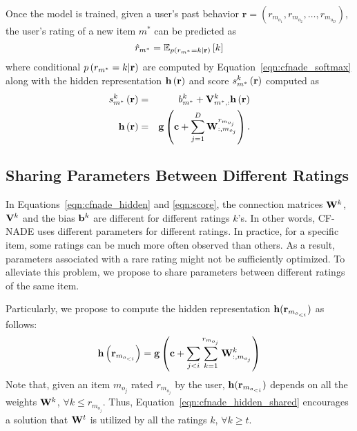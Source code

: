 \documentclass{article}
\newcommand{\cfnade}{CF-NADE\xspace}
\begin{document}
Once the model is trained, given a user's past behavior $\mathbf{r} =
(r_{m_{o_1}}, r_{m_{o_2}}, \ldots, r_{m_{o_D}})$, the user's rating of
a new item $m^*$ can be predicted as 
\begin{equation}
{\hat r}_{m^*} = \mathbb{E}_{p\left ( r_{m^{*}}=k|{\bf r} \right )}\left[k\right]
\end{equation}
where conditional $p\left ( r_{m^{*}}=k|{\bf r} \right )$ are computed by Equation~\ref{eqn:cfnade_softmax} along with the hidden representation $\mathbf{h}\left ( {\bf r} \right )$ and score $s_{m^*}^{k}\left({\bf r}\right)$ computed as 
\begin{eqnarray}
s_{m^*}^{k}\left({\bf r}\right) &=&b^{k}_{m^*} +\mathbf{V}^{k}_{m^*,:}\mathbf{h}\left ( {\bf r} \right )\\
\mathbf{h}\left ( {\bf r} \right ) &=& {\bf g}\left( \mathbf{c}+\sum_{j=1}^D\mathbf{W}^{r_{m_{o_j}}}_{:,m_{o_j}} \right ) .
\end{eqnarray}






\subsection{Sharing Parameters Between Different Ratings}
\label{sec:accu}

In Equations~\ref{eqn:cfnade_hidden} and \ref{eqn:score}, the
connection matrices ${\bf W}^k$, ${\bf V}^k$ and the bias ${\bf b}^k$
are different for different ratings $k$'s. In other words, \cfnade
uses different parameters for different ratings. In practice, for a
specific item, some ratings can be much more often observed than
others.  As a result, parameters associated with a rare rating might
not be sufficiently optimized. To alleviate this problem, we propose
to share parameters between different ratings of the same item.

Particularly, we propose to compute the hidden representation $\mathbf{h} ( {\bf r}_{m_{o_{<i}}} )$ as follows:
\begin{equation}
  \mathbf{h}\left ( {\bf r}_{m_{o_{<i}}} \right ) = {\bf g}\left( \mathbf{c}+\sum_{j<i}\sum_{k=1}^{r_{m_{o_j}}}\mathbf{W}_{:,m_{o_j}}^{k} \right ) \label{eqn:cfnade_hidden_shared}  
\end{equation}
Note that, given an item $m_{o_j}$ rated $ r_{m_{o_j}}$ by the user,
$\mathbf{h}( {\bf r}_{m_{o_{<i}}} )$ depends on all the weights
${\bf W}^{k}$, $\forall k \le r_{m_{o_j}}$. Thus,
Equation~\ref{eqn:cfnade_hidden_shared} encourages a solution that
${\bf W}^{t}$ is utilized by all the ratings $k$, $\forall k \ge t$.
\end{document}
